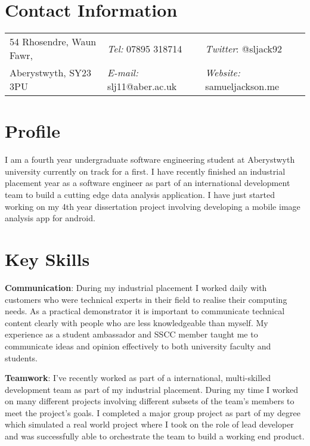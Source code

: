 \documentclass[margin,line]{res}
\begin{document}

\begin{resume}
\section{\sc Contact Information}
\vspace{.05in}
\begin{tabular}{@{}p{2in}p{2in}p{2in}}
54 Rhosendre, Waun Fawr,             & {\it Tel:}  07895 318714 & {\it Twitter}: @sljack92 \\
Aberystwyth, SY23 3PU & {\it E-mail:}  slj11@aber.ac.uk & {\it Website:} samueljackson.me \\
\end{tabular}

\section{\sc Profile}
I am a fourth year undergraduate software engineering student at Aberystwyth university currently on track for a first. I have recently finished an industrial placement year as a software engineer as part of an international development team to build a cutting edge data analysis application. I have just started working on my 4th year dissertation project involving developing a mobile image analysis app for android.

\section{\sc Key Skills}

{\bf Communication}: During my industrial placement I worked daily with customers who were technical experts in their field to realise their computing needs. As a practical demonstrator it is important to communicate technical content clearly with people who are less knowledgeable than myself. My experience as a student ambassador and SSCC member taught me to communicate ideas and opinion effectively to both university faculty and students.

{\bf Teamwork}: I've recently worked as part of a international, multi-skilled development team as part of my industrial placement. During my time I worked on many different projects involving different subsets of the team's members to meet the project's goals. I completed a major group project as part of my degree which simulated a real world project where I took on the role of lead developer and was successfully able to orchestrate the team to build a working end product.


\end{resume}
\end{document}
